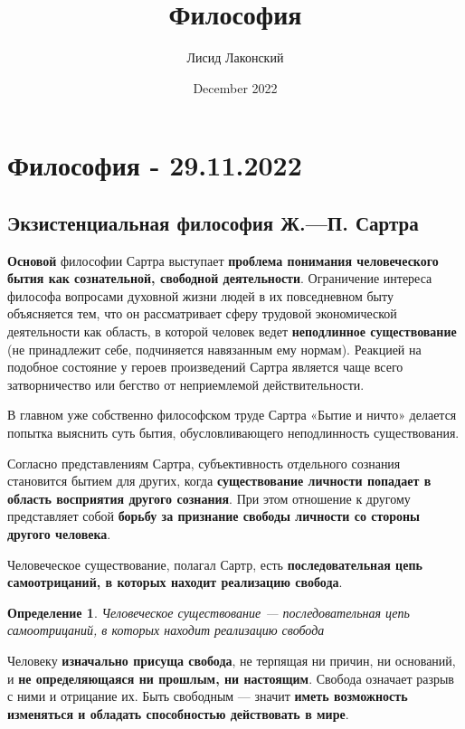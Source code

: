 \documentclass{article}
\title{Философия}
\author{Лисид Лаконский}
\date{December 2022}
\newtheorem{definition}{Определение}
\begin{document}
\maketitle
\tableofcontents
\pagebreak

\section{Философия - 29.11.2022}

\subsection{Экзистенциальная философия Ж.—П. Сартра}

\begin{flushleft}

\textbf{Основой} философии Сартра выступает \textbf{проблема понимания человеческого бытия как сознательной, свободной деятельности}. Ограничение интереса философа вопросами духовной жизни людей в их повседневном быту объясняется тем, что он рассматривает сферу трудовой экономической деятельности как область, в которой человек ведет \textbf{неподлинное существование} (не принадлежит себе, подчиняется навязанным ему нормам). Реакцией на подобное состояние у героев произведений Сартра является чаще всего затворничество или бегство от неприемлемой действительности.

\hfill

В главном уже собственно философском труде Сартра «Бытие и ничто» делается попытка выяснить суть бытия, обусловливающего неподлинность существования.

\hfill

Согласно представлениям Сартра, субъективность отдельного сознания становится бытием для других, когда \textbf{существование личности попадает в область восприятия другого сознания}. При этом отношение к другому представляет собой \textbf{борьбу за признание свободы личности со стороны другого человека}.

\hfill

Человеческое существование, полагал Сартр, есть \textbf{последовательная цепь самоотрицаний, в которых находит реализацию свобода}.

\begin{definition}
    Человеческое существование — последовательная цепь самоотрицаний, в которых находит реализацию свобода
\end{definition}

Человеку \textbf{изначально присуща свобода}, не терпящая ни причин, ни оснований, и \textbf{не определяющаяся ни прошлым, ни настоящим}. Свобода означает разрыв с ними и отрицание их. Быть свободным — значит \textbf{иметь возможность изменяться и обладать способностью действовать в мире}.


\end{flushleft}
\end{document}
